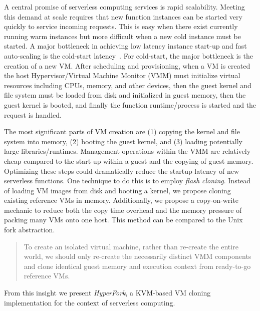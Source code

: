  A central promise of
serverless computing services is rapid scalability. Meeting this demand at
scale requires that new function instances can be started very quickly to
service incoming requests. This is easy when there exist currently running
warm instances but more difficult when a new cold instance must
be started. A major bottleneck in achieving low latency instance start-up and
fast auto-scaling is the cold-start latency~\cite{peeking}. For cold-start, the
major bottleneck is the creation of a new VM. After scheduling and
provisioning, when a VM is created the host Hypervisor/Virtual Machine Monitor
(VMM) must initialize virtual resources including CPUs, memory, and other
devices, then the guest kernel and file system must be loaded from disk and
initialized in guest memory, then the guest kernel is booted, and finally the
function runtime/process is started and the request is handled.

 The most significant parts of VM creation are (1)
copying the kernel and file system into memory, (2) booting the guest kernel,
and (3) loading potentially large libraries/runtimes. Management operations
within the VMM are relatively cheap compared to the start-up within a guest and
the copying of guest memory. Optimizing these steps could dramatically reduce
the startup latency of new serverless functions. One technique to do this is to
employ \emph{flash cloning}. Instead of loading VM images from disk and booting
a kernel, we propose cloning existing reference VMs in memory. Additionally, we
propose a copy-on-write mechanic to reduce both the copy time overhead and the
memory pressure of packing many VMs onto one host. This method can be compared
to the Unix fork abstraction.


\begin{quote} To create an isolated virtual machine, rather than re-create the
entire world, we should only re-create the necessarily distinct VMM components
and clone identical guest memory and execution context from ready-to-go
reference VMs.
\end{quote}

From this insight we present \emph{HyperFork}, a KVM-based VM cloning
implementation for the context of serverless computing.

